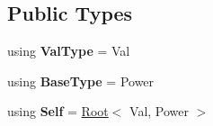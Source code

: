 \subsection*{Public Types}
\begin{DoxyCompactItemize}
\item 
\hypertarget{classlatex_1_1math_1_1Root_a58328f60cf2e5a35536bb778abd47ec9}{using {\bfseries Val\-Type} = Val}\label{classlatex_1_1math_1_1Root_a58328f60cf2e5a35536bb778abd47ec9}

\item 
\hypertarget{classlatex_1_1math_1_1Root_ae462dadf6e1f1cbbaecc5cf596ae87af}{using {\bfseries Base\-Type} = Power}\label{classlatex_1_1math_1_1Root_ae462dadf6e1f1cbbaecc5cf596ae87af}

\item 
\hypertarget{classlatex_1_1math_1_1Root_a6d713101895d4a60cfe5960caf9c0714}{using {\bfseries Self} = \hyperlink{classlatex_1_1math_1_1Root}{Root}$<$ Val, Power $>$}\label{classlatex_1_1math_1_1Root_a6d713101895d4a60cfe5960caf9c0714}

\end{DoxyCompactItemize}
